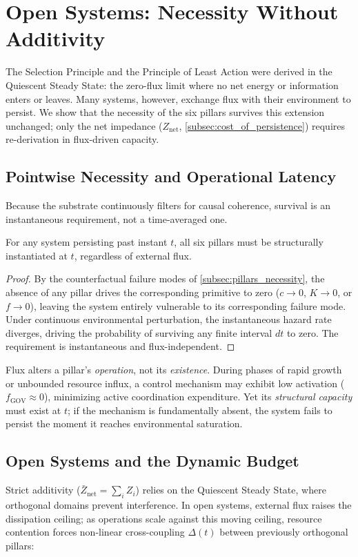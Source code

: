 \section{Open Systems: Necessity Without Additivity}
\label{sec:open_systems}
The Selection Principle and the Principle of Least Action were derived in the Quiescent Steady State: the zero-flux limit where no net energy or information enters or leaves. Many systems, however, exchange flux with their environment to persist. We show that the necessity of the six pillars survives this extension unchanged; only the net impedance ($Z_{\mathrm{net}}$, \cref{subsec:cost_of_persistence}) requires re-derivation in flux-driven capacity.

\subsection{Pointwise Necessity and Operational Latency}
\label{subsec:necessity_flux_independent}
Because the substrate continuously filters for causal coherence, survival is an instantaneous requirement, not a time-averaged one.

\begin{proposition}
\label{prop:pointwise_necessity}
For any system persisting past instant $t$, all six pillars must be structurally instantiated at $t$, regardless of external flux.
\end{proposition}

\begin{proof}
By the counterfactual failure modes of \cref{subsec:pillars_necessity}, the absence of any pillar drives the corresponding primitive to zero ($c \to 0$, $K \to 0$, or $f \to 0$), leaving the system entirely vulnerable to its corresponding failure mode. Under continuous environmental perturbation, the instantaneous hazard rate diverges, driving the probability of surviving any finite interval $dt$ to zero. The requirement is instantaneous and flux-independent.
\end{proof}

Flux alters a pillar's \emph{operation}, not its \emph{existence}. During phases of rapid growth or unbounded resource influx, a control mechanism may exhibit low activation ($f_{\mathrm{GOV}} \approx 0$), minimizing active coordination expenditure. Yet its \emph{structural capacity} must exist at $t$; if the mechanism is fundamentally absent, the system fails to persist the moment it reaches environmental saturation.


\subsection{Open Systems and the Dynamic Budget}
\label{subsec:open_systems_dynamic_budget}
Strict additivity ($\bar{Z}_{\mathrm{net}} = \sum_i Z_i$) relies on the Quiescent Steady State, where orthogonal domains prevent interference. In open systems, external flux raises the dissipation ceiling; as operations scale against this moving ceiling, resource contention forces non-linear cross-coupling $\Delta(t)$ between previously orthogonal pillars:

